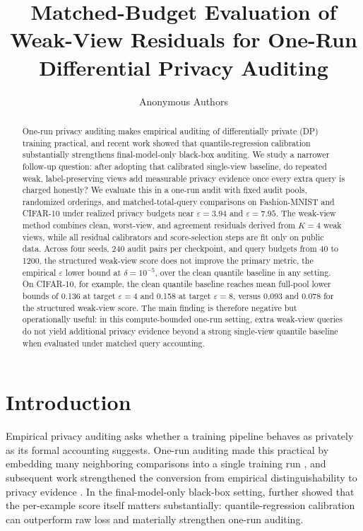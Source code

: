 \documentclass{article}
\title{Matched-Budget Evaluation of Weak-View Residuals for One-Run Differential Privacy Auditing}
\author{Anonymous Authors}
\newcommand{\eps}{\varepsilon}
\newcommand{\del}{\delta}
\begin{document}
\maketitle

\begin{abstract}
One-run privacy auditing makes empirical auditing of differentially private (DP) training practical, and recent work showed that quantile-regression calibration substantially strengthens final-model-only black-box auditing. We study a narrower follow-up question: after adopting that calibrated single-view baseline, do repeated weak, label-preserving views add measurable privacy evidence once every extra query is charged honestly? We evaluate this in a one-run audit with fixed audit pools, randomized orderings, and matched-total-query comparisons on Fashion-MNIST and CIFAR-10 under realized privacy budgets near \(\eps=3.94\) and \(\eps=7.95\). The weak-view method combines clean, worst-view, and agreement residuals derived from \(K=4\) weak views, while all residual calibrators and score-selection steps are fit only on public data. Across four seeds, 240 audit pairs per checkpoint, and query budgets from 40 to 1200, the structured weak-view score does not improve the primary metric, the empirical \(\eps\) lower bound at \(\del=10^{-5}\), over the clean quantile baseline in any setting. On CIFAR-10, for example, the clean quantile baseline reaches mean full-pool lower bounds of 0.136 at target \(\eps=4\) and 0.158 at target \(\eps=8\), versus 0.093 and 0.078 for the structured weak-view score. The main finding is therefore negative but operationally useful: in this compute-bounded one-run setting, extra weak-view queries do not yield additional privacy evidence beyond a strong single-view quantile baseline when evaluated under matched query accounting.
\end{abstract}

\section{Introduction}
Empirical privacy auditing asks whether a training pipeline behaves as privately as its formal accounting suggests. One-run auditing made this practical by embedding many neighboring comparisons into a single training run \citep{steinke2023privacy}, and subsequent work strengthened the conversion from empirical distinguishability to privacy evidence \citep{mahloujifar2024auditing}. In the final-model-only black-box setting, \citet{liu2025enhancing} further showed that the per-example score itself matters substantially: quantile-regression calibration can outperform raw loss and materially strengthen one-run auditing.
\end{document}
